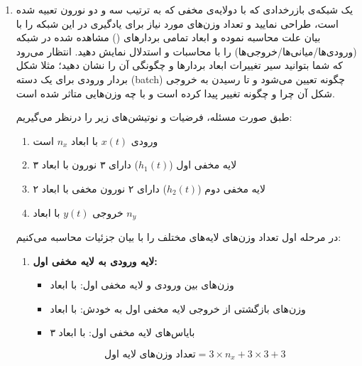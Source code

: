 \begin{enumerate}
\begin{qsolve}
\begin{latin}
\begin{thebibliography}{9}
			S. Ruder, (2016). An overview of gradient descent optimization algorithms. (\href{https://arxiv.org/abs/1609.04747}{\textcolor{magenta}{Link}})
		\end{thebibliography} 
	\end{latin}
\end{qsolve}



	\item
یک شبکه‌ی بازرخدادی  که با دولایه‌ی مخفی که به ترتیب سه و دو نورون تعبیه شده است، طراحی نمایید و تعداد وزن‌های مورد نیاز برای یادگیری در این شبکه را با بیان علت محاسبه نموده و ابعاد تمامی بردارهای () مشاهده شده در شبکه (ورودی‌ها/میانی‌ها/خروجی‌ها) را با محاسبات و استدلال نمایش دهید. انتظار می‌رود که شما بتوانید سیر تغییرات ابعاد بردارها و چگونگی آن را نشان دهید؛ مثلا شکل بردار ورودی برای یک دسته (batch) چگونه تعیین می‌شود و تا رسیدن به خروجی شکل آن چرا و چگونه تغییر پیدا کرده است و با چه وزن‌هایی متاثر شده است.



\begin{qsolve}
طبق صورت مسئله، فرضیات و نوتیشن‌های زیر را درنظر می‌گیریم:

\begin{enumerate}
	\item ورودی $x(t)$ با ابعاد $n_x$ است
	\item لایه مخفی اول ($h_1(t)$) دارای ۳ نورون با ابعاد ۳
	\item لایه مخفی دوم ($h_2(t)$) دارای ۲ نورون مخفی با ابعاد ۲
	\item خروجی $y(t)$ با ابعاد $n_y$
\end{enumerate}

در مرحله اول تعداد وزن‌های لایه‌های مختلف را با بیان جزئیات محاسبه می‌کنیم:

\begin{enumerate}
	\item 
	\textbf{لایه ورودی به لایه مخفی اول: }
	\begin{itemize}
		\item وزن‌های بین ورودی و لایه مخفی اول:  با ابعاد 
		\item وزن‌های بازگشتی از خروجی لایه مخفی اول به خودش:  با ابعاد 
		\item بایاس‌های لایه مخفی اول:  با ابعاد ۳
	\end{itemize}
	
	\[
	\text{تعداد وزن‌های لایه اول} = 3 \times n_x + 3 \times 3 + 3
	\]
	

\end{enumerate}
\end{qsolve}
\end{enumerate}
